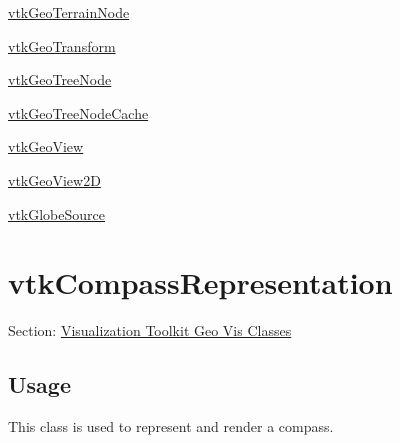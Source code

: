 \begin{DoxyItemize}
\item \hyperlink{vtkgeovis_vtkgeoterrainnode}{vtk\-Geo\-Terrain\-Node}  
\item \hyperlink{vtkgeovis_vtkgeotransform}{vtk\-Geo\-Transform}  
\item \hyperlink{vtkgeovis_vtkgeotreenode}{vtk\-Geo\-Tree\-Node}  
\item \hyperlink{vtkgeovis_vtkgeotreenodecache}{vtk\-Geo\-Tree\-Node\-Cache}  
\item \hyperlink{vtkgeovis_vtkgeoview}{vtk\-Geo\-View}  
\item \hyperlink{vtkgeovis_vtkgeoview2d}{vtk\-Geo\-View2\-D}  
\item \hyperlink{vtkgeovis_vtkglobesource}{vtk\-Globe\-Source}  
\end{DoxyItemize}\hypertarget{vtkgeovis_vtkcompassrepresentation}{}\section{vtk\-Compass\-Representation}\label{vtkgeovis_vtkcompassrepresentation}
Section\-: \hyperlink{sec_vtkgeovis}{Visualization Toolkit Geo Vis Classes} \hypertarget{vtkwidgets_vtkxyplotwidget_Usage}{}\subsection{Usage}\label{vtkwidgets_vtkxyplotwidget_Usage}
This class is used to represent and render a compass.

